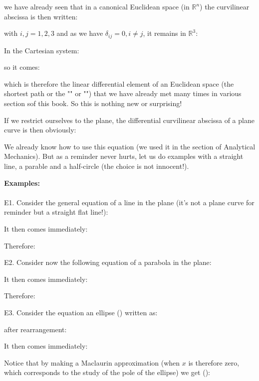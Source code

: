 {	we have already seen that in a canonical Euclidean space (in $\mathbb{R}^n$) the curvilinear abscissa is then written:
	
	with $i,j=1,2,3$ and as we have $\delta_{ij}=0,i\neq j$, it remains in $\mathbb{R}^3$:
	
	In the Cartesian system:
	
	so it comes:
	
	which is therefore the linear differential element of an Euclidean space (the shortest path or the "" or "") that we have already met many times in various section sof this book. So this is nothing new or surprising!
	
	If we restrict ourselves to the plane, the differential curvilinear abscissa of a plane curve is then obviously:
	
	We already know how to use this equation (we used it in the section of Analytical Mechanics). But as a reminder never hurts, let us do examples with a straight line, a parable and a half-circle (the choice is not innocent!).
	\begin{tcolorbox}[colframe=black,colback=white,sharp corners]
	\textbf{{\Large {}}Examples:}\\\\
	E1. Consider the general equation of a line in the plane (it's not a plane curve for reminder but a straight flat line!):
	
	It then comes immediately:
	
	Therefore:
	
	E2. Consider now the following equation of a parabola in the plane:
	
	It then comes immediately:
	
	Therefore:
	
	E3. Consider the equation an ellipse () written as:
	
	after rearrangement:
	
	It then comes immediately:
	
	
	\end{tcolorbox}
	
	\pagebreak
	\begin{tcolorbox}[colframe=black,colback=white,sharp corners]
	Notice that by making a Maclaurin approximation (when $x$ is therefore zero, which corresponds to the study of the pole of the ellipse) we get ():
	

\end{tcolorbox}}
